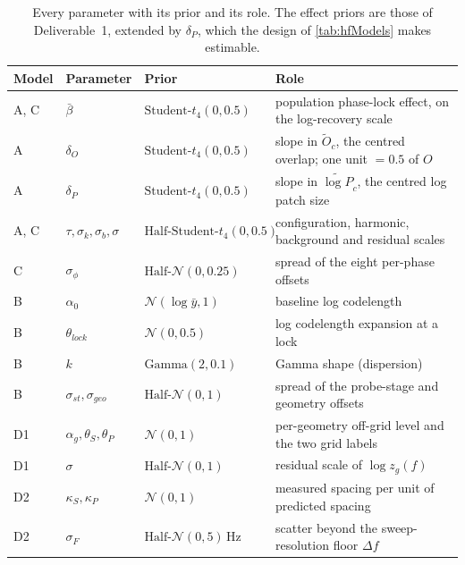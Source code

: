 \begin{table}[t]
    \centering
    \small
    \begin{tabular}{@{}lllp{4.9cm}@{}}
        \toprule
        \textbf{Model} & \textbf{Parameter} & \textbf{Prior} & \textbf{Role} \\
        \midrule
        A, C & $\bar\beta$                     & $\text{Student-}t_4(0,0.5)$      & population phase-lock effect, on the log-recovery scale \\
        A    & $\delta_O$                      & $\text{Student-}t_4(0,0.5)$      & slope in $\widetilde O_c$, the centred overlap; one unit $=0.5$ of $O$ \\
        A    & $\delta_P$                      & $\text{Student-}t_4(0,0.5)$      & slope in $\widetilde{\log P}_c$, the centred log patch size \\
        A, C & $\tau,\sigma_k,\sigma_b,\sigma$  & $\text{Half-Student-}t_4(0,0.5)$ & configuration, harmonic, background and residual scales \\
        C    & $\sigma_\phi$                   & $\text{Half-}\mathcal N(0,0.25)$ & spread of the eight per-phase offsets \\
        B    & $\alpha_0$                      & $\mathcal N(\log \bar y, 1)$     & baseline log codelength \\
        B    & $\theta_{lock}$                 & $\mathcal N(0,0.5)$              & log codelength expansion at a lock \\
        B    & $k$                             & $\text{Gamma}(2,0.1)$            & Gamma shape (dispersion) \\
        B    & $\sigma_{st},\sigma_{geo}$      & $\text{Half-}\mathcal N(0,1)$    & spread of the probe-stage and geometry offsets \\
        D1   & $\alpha_g,\theta_S,\theta_P$    & $\mathcal N(0,1)$                & per-geometry off-grid level and the two grid labels \\
        D1   & $\sigma$                        & $\text{Half-}\mathcal N(0,1)$    & residual scale of $\log z_g(f)$ \\
        D2   & $\kappa_S,\kappa_P$             & $\mathcal N(0,1)$                & measured spacing per unit of predicted spacing \\
        D2   & $\sigma_F$                      & $\text{Half-}\mathcal N(0,5)$\,Hz & scatter beyond the sweep-resolution floor $\Delta f$ \\
        \bottomrule
    \end{tabular}
    \caption{Every parameter with its prior and its role. The effect priors are those of Deliverable~1, extended by $\delta_P$, which the design of \autoref{tab:hfModels} makes estimable.}
    \label{tab:bayesPriors}
\end{table}
